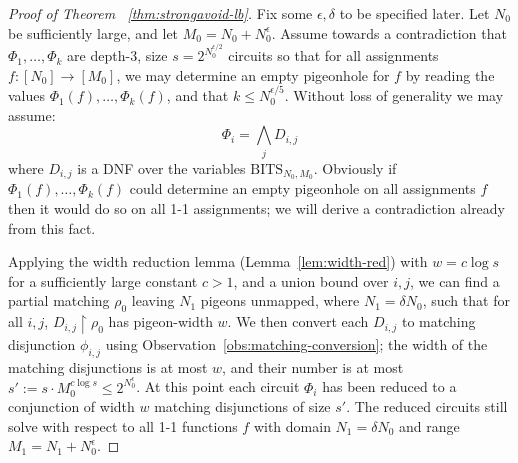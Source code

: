 \begin{proof}[Proof of Theorem ~\ref{thm:strongavoid-lb}]
Fix some $\epsilon, \delta$ to be specified later. Let $N_0$ be sufficiently large, and let $M_0 = N_0 + N_0^{\epsilon}$.
Assume towards a contradiction that $\Phi_1,\ldots,\Phi_k$ are depth-3, size $s = 2^{N_0^{\epsilon/2}}$ circuits so that for all assignments $f: [N_0] \to [M_0]$, we may determine an empty pigeonhole for $f$ by reading the values $\Phi_1(f),\ldots,\Phi_k(f)$, and that $k \leq N_0^{\epsilon/5}$. Without loss of generality we may assume:
\[
\Phi_i = \bigwedge_{j} D_{i,j}
\]
where $D_{i,j}$ is a DNF over the variables $\mathrm{BITS}_{N_0,M_0}$. Obviously if $\Phi_1(f),\ldots,\Phi_k(f)$ could determine an empty pigeonhole on all assignments $f$ then it would do so on all 1-1 assignments; we will derive a contradiction already from this fact.


Applying the width reduction lemma (Lemma~\ref{lem:width-red})
with $w = c \log s$ for a sufficiently large constant $c>1$, and a union bound over $i,j$, we can find a partial matching $\rho_0$ 
leaving $N_1$ pigeons unmapped, where $N_1 =  \delta N_0 $, 
such that for all $i,j$, $D_{i,j} \upharpoonright \rho_0$ has pigeon-width $w$. We then convert each $D_{i,j}$ to matching disjunction $\phi_{i,j}$ using Observation~\ref{obs:matching-conversion}; the width of the matching disjunctions is at most $w$, and their number is at most $s':= s \cdot M_0^{c \log s} \leq 2^{N_0^\epsilon}$.
At this point each circuit $\Phi_i$ has been reduced to a conjunction of width $w$ matching disjunctions of size $s'$. The reduced circuits still solve \avoid with respect to all 1-1 functions $f$ with domain  $N_1= \delta N_0 $ and range $M_1 = N_1 + N_0^{\epsilon}$.


\end{proof}

